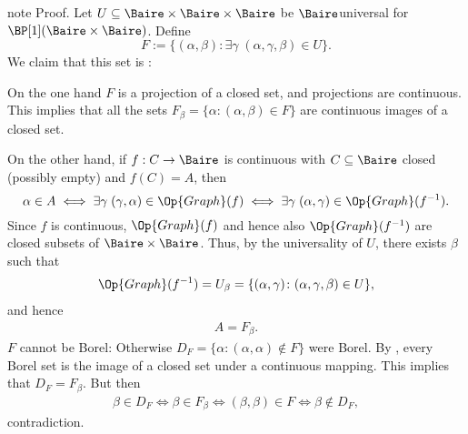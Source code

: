 \documentclass[letterpaper,10pt,english]{jupyterBook}
\begin{document}
\begin{sphinxadmonition}{note}
\sphinxAtStartPar
Proof. Let \(U \subseteq \Baire \times \Baire \times \Baire\) be \(\Baire\)\sphinxhyphen{}universal for \(\BP[1](\Baire \times \Baire)\).
Define
\begin{equation*}
    F:= \{(\alpha,\beta) \colon \exists \gamma  \; (\alpha,\gamma,\beta) \in U\}.
\end{equation*}
\sphinxAtStartPar
We claim that this set is :

\sphinxAtStartPar
On the one hand \(F\) is a projection of a closed set, and projections are continuous. This implies that all the sets \(F_\beta = \{ \alpha \colon (\alpha,\beta) \in F \}\) are continuous images of a closed set.

\sphinxAtStartPar
On the other hand, if \(f: C \to \Baire\) is continuous with \(C \subseteq \Baire\) closed (possibly empty) and \(f(C) = A\), then
\begin{equation*}
    \alpha \in A \iff \exists \gamma \; (\gamma,\alpha) \in \Op{Graph}(f) \iff \exists \gamma \; (\alpha,\gamma) \in  \Op{Graph}(f^{-1}).
\end{equation*}
\sphinxAtStartPar
Since \(f\) is continuous, \(\Op{Graph}(f)\) and hence also \(\Op{Graph}(f^{-1})\) are closed subsets of \(\Baire \times \Baire\). Thus, by the universality of \(U\), there exists \(\beta\) such that
\begin{equation*}
\begin{split}
    \Op{Graph}(f^{-1}) = U_\beta = \{ (\alpha,\gamma) \colon (\alpha,\gamma,\beta) \in U \},
\end{split}
\end{equation*}
\sphinxAtStartPar
and hence
\begin{equation*}
\begin{split}
    A = F_\beta.
\end{split}
\end{equation*}
\sphinxAtStartPar
\(F\) cannot be Borel: Otherwise \(D_F = \{\alpha \colon (\alpha,\alpha) \not\in F \}\) were Borel. By {\hyperref[\detokenize{imagesBorel:cor-Borel-image-closed}]{}}, every Borel set is the image of a closed set under a continuous mapping. This implies that \(D_F = F_\beta\). But then
\begin{equation*}
\begin{split}
    \beta \in D_F \iff \beta \in F_\beta \iff (\beta,\beta) \in F \iff \beta \not\in D_F,  
\end{split}
\end{equation*}
\sphinxAtStartPar
contradiction.
\end{sphinxadmonition}
\end{document}
